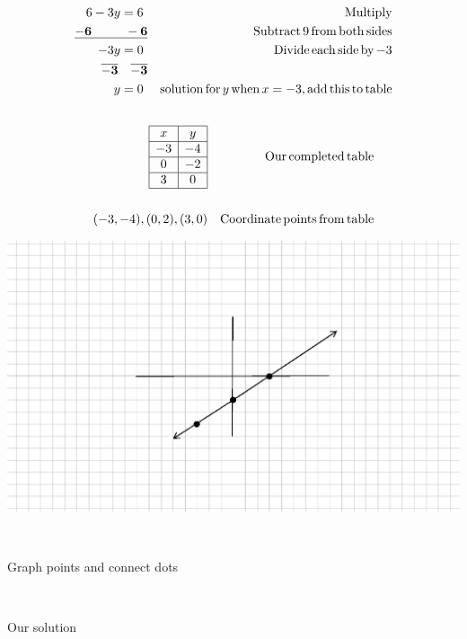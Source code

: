 \begin{example}
\begin{eqnarray*}
    6 - 3 y = 6~ &  & \operatorname{Multiply}\\
    \bf{\underline{- 6 ~~~~~~~~- 6}} &  & \operatorname{Subtract} 9 \operatorname{from} \operatorname{both}
    \operatorname{sides}\\
    - 3 y = 0~ &  & \operatorname{Divide} \operatorname{each} \operatorname{side} \operatorname{by} - 3\\
    \bf{\overline{- 3} ~~~ \overline{- 3}} &  & \\
    y = 0~ &  & \operatorname{solution} \operatorname{for} y \operatorname{when} x = - 3, \operatorname{add}
    \operatorname{this} \operatorname{to} \operatorname{table}\\
    &  & \\
      \end{eqnarray*}
      \begin{eqnarray*}
		\begin{array}{|c|c|}
      \hline
      x & y\\
      \hline
      - 3 & - 4\\
      \hline
      0 & - 2\\
      \hline
      3 & 0\\
      \hline
    \end{array} &  & \operatorname{Our} \operatorname{completed} \operatorname{table}\\
    &  & \\
    (- 3, - 4), (0, 2), (3, 0) &  & \operatorname{Coordinate} \operatorname{points} \operatorname{from}
    \operatorname{table}
  \end{eqnarray*}
  \begin{multicols}{2}
    \includegraphics[scale=.9,bb = 115 65 310 190, clip=true]{II_1_3b-8.eps}
    
    \
    
     Graph points and connect dots
    
    \
    
     Our solution
  \end{multicols}
\end{example}